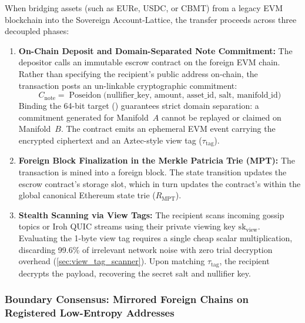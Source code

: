\documentclass[a4paper,11pt,twoside,parskip=half-,headings=small]{scrartcl}
\begin{document}
When bridging assets (such as EURe, USDC, or CBMT) from a legacy EVM blockchain into the Sovereign Account-Lattice, the transfer proceeds across three decoupled phases:
\begin{enumerate}[nosep]
  \item \textbf{On-Chain Deposit and Domain-Separated Note Commitment:}
  The depositor calls an immutable escrow contract on the foreign EVM chain. Rather than specifying the recipient's public address on-chain, the transaction posts an un-linkable cryptographic commitment:
  \begin{equation}
    C_{\text{note}} = \operatorname{Poseidon}\bigl(\text{nullifier\_key},\, \text{amount},\, \text{asset\_id},\, \text{salt},\, \text{manifold\_id}\bigr)
    \label{eq:cross_chain_commitment}
  \end{equation}
  Binding the 64-bit target  () guarantees strict domain separation: a commitment generated for Manifold~$A$ cannot be replayed or claimed on Manifold~$B$. The contract emits an ephemeral EVM event carrying the encrypted ciphertext and an Aztec-style view tag ($\tau_{\text{tag}}$).
  
  \item \textbf{Foreign Block Finalization in the Merkle Patricia Trie (MPT):}
  The transaction is mined into a foreign block. The state transition updates the escrow contract's storage slot, which in turn updates the contract's  within the global canonical Ethereum state trie ($R_{\text{MPT}}$).

  \item \textbf{Stealth Scanning via View Tags:}
  The recipient scans incoming gossip topics or Iroh QUIC streams using their private viewing key $\text{sk}_{\text{view}}$. Evaluating the 1-byte view tag requires a single cheap scalar multiplication, discarding 99.6\% of irrelevant network noise with zero trial decryption overhead (\cref{sec:view_tag_scanner}). Upon matching $\tau_{\text{tag}}$, the recipient decrypts the payload, recovering the secret salt and nullifier key.
\end{enumerate}

\subsubsection{Boundary Consensus: Mirrored Foreign Chains on Registered Low-Entropy Addresses}
\end{document}
